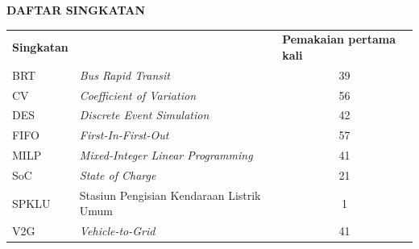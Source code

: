\cleardoublepage
\vspace{2cm}
\begin{center}
{\fontsize{14}{16.8}\selectfont\textbf{DAFTAR SINGKATAN}}\\[1em]
\end{center}
\label{chap:singkatan}
\setcounter{chapter}{0}
\setcounter{section}{0}
\vspace{2em}




\begin{longtable}{@{} l >{\raggedright\arraybackslash}p{7.5cm} c @{}}
\multicolumn{1}{l}{\textbf{Singkatan}} & \multicolumn{1}{l}{\textbf{Deskripsi}} & \multicolumn{1}{l}{\parbox[c]{3.5cm}{\raggedright \textbf{Pemakaian pertama kali}}} \\


BRT & \textit{Bus Rapid Transit} & 39 \\
CV & \textit{Coefficient of Variation} & 56 \\
DES & \textit{Discrete Event Simulation} & 42 \\
FIFO & \textit{First-In-First-Out} & 57 \\
MILP & \textit{Mixed-Integer Linear Programming} & 41 \\
SoC & \textit{State of Charge} & 21 \\
SPKLU & Stasiun Pengisian Kendaraan Listrik Umum & 1 \\
V2G & \textit{Vehicle-to-Grid} & 41 \\


\end{longtable}

